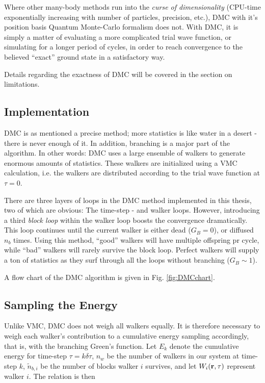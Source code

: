 Where other many-body methods run into the \textit{curse of dimensionality} (CPU-time exponentially increasing with number of particles, precision, etc.), DMC with it's position basis Quantum Monte-Carlo formalism does not. With DMC, it is simply a matter of evaluating a more complicated trial wave function, or simulating for a longer period of cycles, in order to reach convergence to the believed ``exact'' ground state in a satisfactory way.

Details regarding the exactness of DMC will be covered in the section on limitations.

\subsection{Implementation}

DMC is as mentioned a precise method; more statistics is like water in a desert - there is never enough of it. In addition, branching is a major part of the algorithm. In other words: DMC uses a large ensemble of walkers to generate enormous amounts of statistics. These walkers are initialized using a VMC calculation, i.e. the walkers are distributed according to the trial wave function at $\tau=0$. 

There are three layers of loops in the DMC method implemented in this thesis, two of which are obvious: The time-step - and walker loops. However, introducing a third \textit{block loop} within the walker loop boosts the convergence dramatically. This loop continues until the current walker is either dead ($G_B = 0$), or diffused $n_b$ times. Using this method, ``good'' walkers will have multiple offspring pr cycle, while ``bad'' walkers will rarely survive the block loop. Perfect walkers will supply a ton of statistics as they surf through all the loops without branching ($G_B \sim 1$).

A flow chart of the DMC algorithm is given in Fig. \ref{fig:DMCchart}. 

\subsection{Sampling the Energy}

Unlike VMC, DMC does not weigh all walkers equally. It is therefore necessary to weigh each walker's contribution to a cumulative energy sampling accordingly, that is, with the branching Green's function. Let $E_k$ denote the cumulative energy for time-step $\tau = k\delta\tau$, $n_w$ be the number of walkers in our system at time-step $k$, $\tilde n_{b,i}$ be the number of blocks walker $i$ survives, and let $W_i(\mathbf{r}, \tau)$ represent walker $i$. The relation is then

